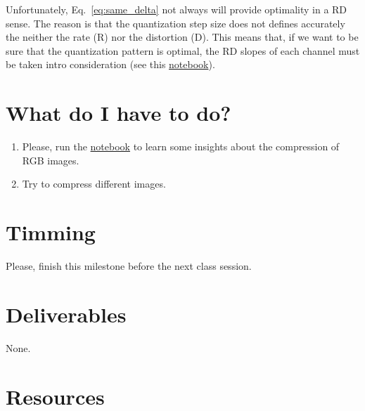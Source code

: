 Unfortunately, Eq.~\eqref{eq:same_delta} not always will provide
optimality in a RD sense. The reason is that the quantization step
size does not defines accurately the neither the rate (R) nor the
distortion (D). This means that, if we want to be sure that the
quantization pattern is optimal, the RD slopes of each channel must be
taken intro consideration (see this
\href{https://github.com/Sistemas-Multimedia/Sistemas-Multimedia.github.io/blob/master/contents/RGB_quantization/RD_performance.ipynb}{notebook}).


\section{What do I have to do?}

\begin{enumerate}
\item Please, run the
  \href{https://github.com/Sistemas-Multimedia/Sistemas-Multimedia.github.io/blob/master/contents/RGB_quantization/RD_performance.ipynb}{notebook}
  to learn some insights about the compression of RGB images.
\item Try to compress different images.
\end{enumerate}

\section{Timming}

Please, finish this milestone before the next class session.

\section{Deliverables}

None.

\section{Resources}

\renewcommand{\addcontentsline}[3]{}%

